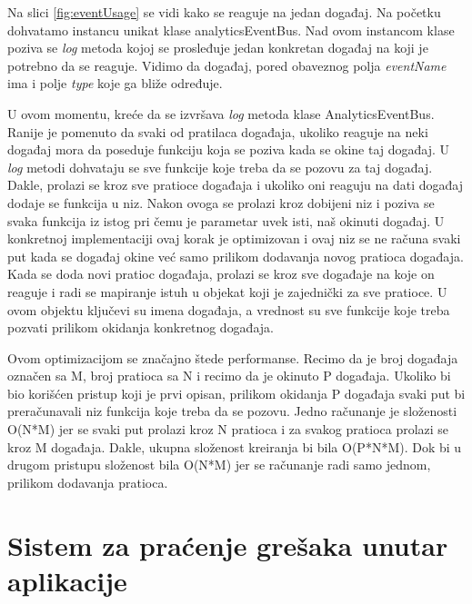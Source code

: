 \documentclass[12pt,oneside]{memoir}
\begin{document}
Na slici \ref{fig:eventUsage} se vidi kako se reaguje na jedan događaj. Na početku dohvatamo instancu unikat klase analyticsEventBus. Nad ovom instancom klase poziva se \textit{log} metoda kojoj se prosleđuje jedan konkretan događaj na koji je potrebno da se reaguje. Vidimo da događaj, pored obaveznog polja \textit{eventName} ima i polje \textit{type} koje ga bliže određuje. \newline

U ovom momentu, kreće da se izvršava \textit{log} metoda klase AnalyticsEventBus. Ranije je pomenuto da svaki od pratilaca događaja, ukoliko reaguje na neki događaj mora da poseduje funkciju koja se poziva kada se okine taj događaj. U \textit{log} metodi dohvataju se sve funkcije koje treba da se pozovu za taj događaj. Dakle, prolazi se kroz sve pratioce događaja i ukoliko oni reaguju na dati događaj dodaje se funkcija u niz. Nakon ovoga se prolazi kroz dobijeni niz i poziva se svaka funkcija iz istog pri čemu je parametar uvek isti, naš okinuti događaj. U konkretnoj implementaciji ovaj korak je optimizovan i ovaj niz se ne računa svaki put kada se događaj okine već samo prilikom dodavanja novog pratioca događaja. Kada se doda novi pratioc događaja, prolazi se kroz sve događaje na koje on reaguje i radi se mapiranje istuh u objekat koji je zajednički za sve pratioce. U ovom objektu ključevi su imena događaja, a vrednost su sve funkcije koje treba pozvati prilikom okidanja konkretnog događaja. \newline

Ovom optimizacijom se značajno štede performanse. Recimo da je broj događaja označen sa M, broj pratioca sa N i recimo da je okinuto P događaja. Ukoliko bi bio korišćen pristup koji je prvi opisan, prilikom okidanja P događaja svaki put bi preračunavali niz funkcija koje treba da se pozovu. Jedno računanje je složenosti O(N*M) jer se svaki put prolazi kroz N pratioca i za svakog pratioca prolazi se kroz M događaja. Dakle, ukupna složenost kreiranja bi bila O(P*N*M)\cite{BigONotation}. Dok bi u drugom pristupu složenost bila O(N*M) jer se računanje radi samo jednom, prilikom dodavanja pratioca.

\chapter{Sistem za praćenje grešaka unutar aplikacije}
\end{document}

